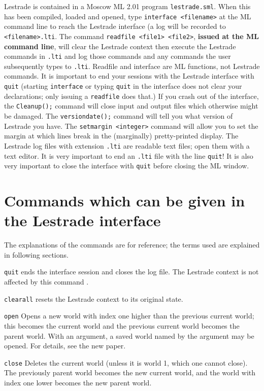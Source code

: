 Lestrade is contained in a Moscow ML 2.01 program {\tt lestrade.sml}.  When this has been compiled, loaded and opened, type {\tt interface <filename>}  at the ML command line to reach the Lestrade interface (a log will be recorded to {\tt <filename>.lti}.   The command {\tt readfile <file1> <file2>}, {\bf  issued at the ML command line}, will  clear the Lestrade context then execute the Lestrade commands in {\tt <file1>.lti} and log those commands and any commands the user subsequently types to {\tt <file2>.lti}.    Readfile and interface are ML functions, not Lestrade commands.  It is important to end your sessions with the Lestrade interface with {\tt quit} (starting {\tt interface} or typing {\tt quit} in the interface does not clear your declarations; only issuing a {\tt readfile} does that.)  If you crash out of the interface, the {\tt Cleanup();} command will close input and output files which otherwise might be damaged.  The {\tt versiondate();} command will tell you what version of Lestrade you have.  The {\tt setmargin <integer>} command will allow you to set the margin at which lines break in the (marginally) pretty-printed display.   The Lestrade log files with extension {\tt .lti} are readable text files; open them with a text editor.  It is very important to end an {\tt .lti} file with the line {\tt quit}!  It is also very important to close the interface with {\tt quit} before closing the ML window.

\section{Commands which can be given in the Lestrade interface}

The explanations of the commands are for reference; the terms used are explained in following sections.

{\tt quit} ends the interface session and closes the log file.  The Lestrade context is not affected by this command .

{\tt clearall} resets the Lestrade context to its original state.

{\tt open}  Opens a new world with index one higher than the previous current world; this becomes the current world and the previous current world becomes the parent world.  With an argument, a saved world named by the argument may be opened.  For details, see the new paper.

{\tt close}   Deletes the current world (unless it is world 1, which one cannot close).   The previously parent world becomes the new current world, and the world with index one lower becomes the new parent world.


